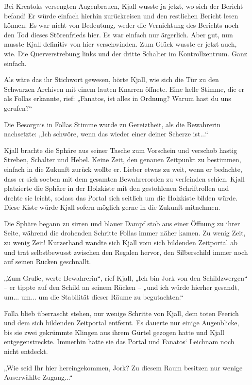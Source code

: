 Bei Kreatoks versengten Augenbrauen, Kjall wusste ja jetzt, wo sich der Bericht befand! Er würde einfach hierhin zurückreisen und den restlichen Bericht lesen können. Es war nicht von Bedeutung, weder die Vernichtung des Berichts noch den Tod dieses Störenfrieds hier. Es war einfach nur ärgerlich. Aber gut, nun musste Kjall definitiv von hier verschwinden. Zum Glück wusste er jetzt auch, wie. Die Querverstrebung links und der dritte Schalter im Kontrollzentrum. Ganz einfach.

Als wäre das ihr Stichwort gewesen, hörte Kjall, wie sich die Tür zu den Schwarzen Archiven mit einem lauten Knarren öffnete. Eine helle Stimme, die er als Follas erkannte, rief: „Fanatos, ist alles in Ordnung? Warum hast du uns gerufen?“

Die Besorgnis in Follas Stimme wurde zu Gereiztheit, als die Bewahrerin nachsetzte: „Ich schwöre, wenn das wieder einer deiner Scherze ist...“

Kjall brachte die Sphäre aus seiner Tasche zum Vorschein und verschob hastig Streben, Schalter und Hebel. Keine Zeit, den genauen Zeitpunkt zu bestimmen, einfach in die Zukunft zurück wollte er. Lieber etwas zu weit, wenn er bedachte, dass er sich soeben mit dem gesamten Bewahrerorden zu verfeinden schien. Kjall platzierte die Sphäre in der Holzkiste mit den gestohlenen Schriftrollen und drehte sie leicht, sodass das Portal sich seitlich um die Holzkiste bilden würde. Diese Kiste würde Kjall sofern möglich gerne in die Zukunft mitnehmen.

Die Sphäre begann zu sirren und blauer Dampf stob aus einer Öffnung zu ihrer Seite, während die drohenden Schritte Follas immer näher kamen. Zu wenig Zeit, zu wenig Zeit! Kurzerhand wandte sich Kjall vom sich bildenden Zeitportal ab und trat selbstbewusst zwischen den Regalen hervor, den Silberschild immer noch auf seinen Rücken geschnallt.

„Zum Gruße, werte Bewahrerin“, rief Kjall, „Ich bin Jork von den Schildzwergen“ – er tippte auf den Schild an seinem Rücken – „und ich würde hierher gesandt, um... um... um die Stabilität dieser Räume zu begutachten.“

Folla blieb überrascht stehen, nur wenige Schritte von Kjall, dem toten Feerich und dem sich bildenden Zeitportal entfernt. Es dauerte nur einige Augenblicke, bis sie zwei gekrümmte Klingen aus ihrem Gürtel gezogen hatte und Kjall entgegenstreckte. Immerhin hatte sie das Portal und Fanatos‘ Leichnam noch nicht entdeckt.

„Wie seid Ihr hier hereingekommen, Jork? Zu diesem Raum besitzen nur wenige Auserwählte Zugang...“

